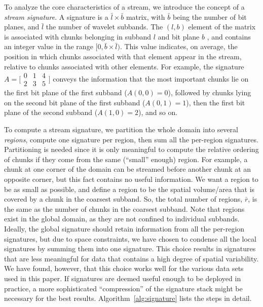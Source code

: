To analyze the core characteristics of a stream, we introduce the concept of a \emph{stream
signature}. A signature is a $\bar{l} \times \bar{b}$ matrix, with $\bar{b}$ being the number of bit
planes, and $\bar{l}$ the number of wavelet subbands. The $(l,b)$ element of the matrix is
associated with chunks belonging in subband $l$ and bit plane $b$ , and contains an integer value in
the range $[0,\bar{b}\times \bar{l})$. This value indicates, on average, the position in which
chunks associated with that element appear in the stream, relative to chunks associated with other
elements. For example, the signature  $A=\bigl[
\begin{smallmatrix}0 & 1 & 4\\ 2 & 3 & 5\end{smallmatrix}\bigr]$ conveys the information that the
most important chunks lie on the first bit plane of the first subband ($A(0,0)=0$), followed by
chunks lying on the second bit plane of the first subband ($A(0,1)=1$), then the first bit plane of
the second subband ($A(1,0)=2$), and so on.

To compute a stream signature, we partition the whole domain into several \emph{regions}, compute
one signature per region, then sum all the per-region signatures. Partitioning is needed since it is
only meaningful to compute the relative ordering of chunks if they come from the same (``small''
enough) region. For example, a chunk at one corner of the domain can be streamed before another
chunk at an opposite corner, but this fact contains no useful information. We want a region to be as
small as possible, and define a region to be the spatial volume/area that is covered by a chunk in
the coarsest subband. So, the total number of regions, $\bar{r}$, is the same as the number of
chunks in the coarsest subband. Note that regions exist in the global domain, as they are not
confined to individual subbands. Ideally, the global signature should retain information from all
the per-region signatures, but due to space constraints, we have chosen to condense all the local
signatures by summing them into one signature. This choice results in signatures that are less
meaningful for data that contains a high degree of spatial variability. We have found, however, that
this choice works well for the various data sets used in this paper. If signatures are deemed useful
enough to be deployed in practice, a more sophisticated ``compression'' of the signature stack might
be necessary for the best results. Algorithm~\ref{alg:signature} lists the steps in detail.

